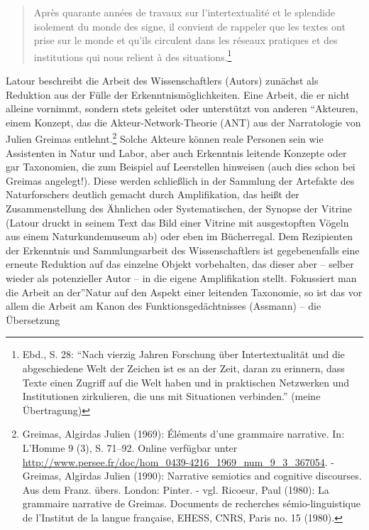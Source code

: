 \begin{quote}
Après quarante années de travaux sur l'intertextualité et le splendide
isolement du monde des signe, il convient de rappeler que les textes ont
prise sur le monde et qu'ils circulent dans les réseaux pratiques et des
institutions qui nous relient à des situations.\footnote{Ebd., S. 28:
  \enquote{Nach vierzig Jahren Forschung über Intertextualität und die
  abgeschiedene Welt der Zeichen ist es an der Zeit, daran zu erinnern,
  dass Texte einen Zugriff auf die Welt haben und in praktischen
  Netzwerken und Institutionen zirkulieren, die uns mit Situationen
  verbinden.} (meine Übertragung)}
\end{quote}

Latour beschreibt die Arbeit des Wissenschaftlers (Autors) zunächst als
Reduktion aus der Fülle der Erkenntnismöglichkeiten. Eine Arbeit, die er
nicht alleine vornimmt, sondern stets geleitet oder unterstützt von
anderen \enquote{Akteuren, einem Konzept, das die Akteur-Network-Theorie
(ANT) aus der Narratologie von Julien Greimas entlehnt.\footnote{Greimas,
  Algirdas Julien (1969): Éléments d'une grammaire narrative. In:
  L'Homme 9 (3), S. 71--92. Online verfügbar unter
  \url{http://www.persee.fr/doc/hom_0439-4216_1969_num_9_3_367054}. -
  Greimas, Algirdas Julien (1990): Narrative semiotics and cognitive
  discourses. Aus dem Franz. übers. London: Pinter. - vgl. Ricoeur, Paul
  (1980): La grammaire narrative de Greimas. Documents de recherches
  sémio-linguistique de l'Institut de la langue française, EHESS, CNRS,
  Paris no. 15 (1980).} Solche Akteure können reale Personen sein wie
Assistenten in Natur und Labor, aber auch Erkenntnis leitende Konzepte
oder gar Taxonomien, die zum Beispiel auf Leerstellen hinweisen (auch
dies schon bei Greimas angelegt!). Diese werden schließlich in der
Sammlung der Artefakte des Naturforschers deutlich gemacht durch
Amplifikation, das heißt der Zusammenstellung des Ähnlichen oder
Systematischen, der Synopse der Vitrine (Latour druckt in seinem Text
das Bild einer Vitrine mit ausgestopften Vögeln aus einem
Naturkundemuseum ab) oder eben im Bücherregal. Dem Rezipienten der
Erkenntnis und Sammlungsarbeit des Wissenschaftlers ist gegebenenfalls
eine erneute Reduktion auf das einzelne Objekt vorbehalten, das dieser
aber -- selber wieder als potenzieller Autor -- in die eigene
Amplifikation stellt. Fokussiert man die Arbeit an der}Natur auf den
Aspekt einer leitenden Taxonomie, so ist das vor allem die Arbeit am
Kanon des Funktionsgedächtnisses (Assmann) -- die Übersetzung

